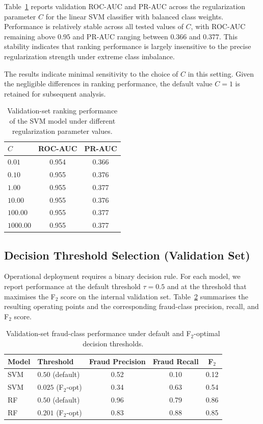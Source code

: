 \documentclass[oneside,12pt,parskip=half,american,numbers=noenddot]{scrreprt}
\begin{document}
Table~\ref{tab:svm_c_results} reports validation ROC-AUC and PR-AUC across the regularization parameter $C$ for the linear SVM classifier with balanced class weights. Performance is relatively stable across all tested values of $C$, with ROC-AUC remaining above $0.95$ and PR-AUC ranging between $0.366$ and $0.377$. This stability indicates that ranking performance is largely insensitive to the precise regularization strength under extreme class imbalance.

The results indicate minimal sensitivity to the choice of $C$ in this setting. Given the negligible differences in ranking performance, the default value $C=1$ is retained for subsequent analysis.

\begin{table}[H]
\centering
\caption{Validation-set ranking performance of the SVM model under different regularization parameter values.}
\label{tab:svm_c_results}
\small
\renewcommand{\arraystretch}{1.2}
\begin{tabular}{lcc}
\hline
\textbf{$C$} & \textbf{ROC-AUC} & \textbf{PR-AUC} \\
\hline
$0.01$   & 0.954 & 0.366 \\
$0.10$   & 0.955 & 0.376 \\
$1.00$   & 0.955 & 0.377 \\
$10.00$  & 0.955 & 0.376 \\
$100.00$ & 0.955 & 0.377 \\
$1000.00$& 0.955 & 0.377 \\
\hline
\end{tabular}
\end{table}


\subsection{Decision Threshold Selection (Validation Set)}
Operational deployment requires a binary decision rule. For each model, we report performance at the default threshold $\tau=0.5$ and at the threshold that maximises the F$_2$ score on the internal validation set. Table~\ref{tab:threshold_comparison} summarises the resulting operating points and the corresponding fraud-class precision, recall, and F$_2$ score.

\begin{table}[H]
\centering
\caption{Validation-set fraud-class performance under default and F$_2$-optimal decision thresholds.}
\label{tab:threshold_comparison}
\small
\renewcommand{\arraystretch}{1.2}
\begin{tabular}{llccc}
\hline
\textbf{Model} & \textbf{Threshold} & \textbf{Fraud Precision} & \textbf{Fraud Recall} & \textbf{F$_2$} \\
\hline
SVM & $0.50$ (default)    & 0.52 & 0.10 & 0.12 \\
SVM & $0.025$ (F$_2$-opt) & 0.34 & 0.63 & 0.54 \\
\hline
RF  & $0.50$ (default)    & 0.96 & 0.79 & 0.86 \\
RF  & $0.201$ (F$_2$-opt) & 0.83 & 0.88 & 0.85 \\
\hline
\end{tabular}
\end{table}
\end{document}
